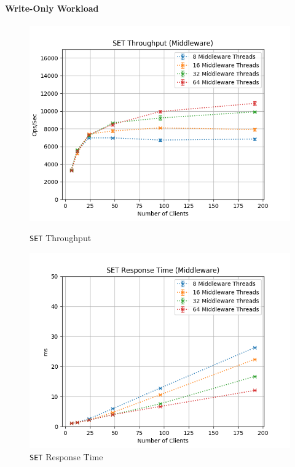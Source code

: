 \documentclass[11pt,a4paper]{article}
\begin{document}
\paragraph{Write-Only Workload}
%
\begin{figure}[H]
	\centering
    \begin{minipage}{0.5\textwidth}
        \centering
        \includegraphics[width=\textwidth]{../illustrations/plots/2_1_one_middleware/1-0/middleware_set_tp_s.png}
        \caption{\texttt{SET} Throughput}
        \label{fig:one_middleware_set_tp_mw}
    \end{minipage}\hfill
    \begin{minipage}{0.5\textwidth}
        \centering
        \includegraphics[width=\textwidth]{../illustrations/plots/2_1_one_middleware/1-0/middleware_set_rt_ms.png}
        \caption{\texttt{SET} Response Time}
        \label{fig:one_middleware_set_rt_mw}
    \end{minipage}
\end{figure}
\end{document}
